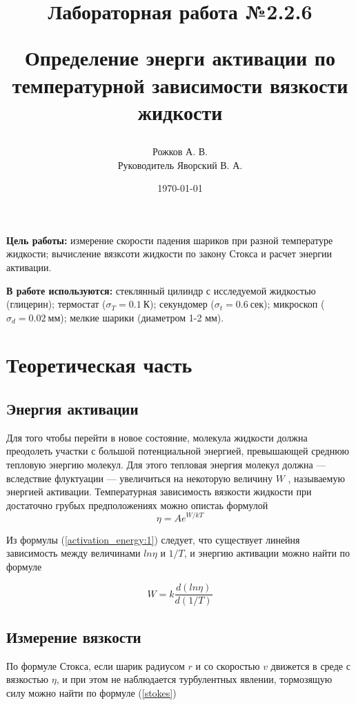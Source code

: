 \documentclass[a4paper, 12pt]{article}
\title{\begin{center}Лабораторная работа №2.2.6\end{center}
Определение энерги активации по температурной зависимости вязкости жидкости}
\author{Рожков А. В. \\ Руководитель Яворский В. А.}
\date{\today}
\begin{document}
    \maketitle
    \newpage


    \textbf{Цель работы:} измерение скорости падения шариков при разной температуре жидкости; вычисление вязксоти жидкости по закону Стокса и расчет энергии активации.

    \textbf{В работе используются:} стеклянный цилиндр с исследуемой жидкостью (глицерин); термостат ($\sigma_T = 0.1~К$); секундомер ($\sigma_t = 0.6~сек$); микроскоп ($\sigma_d = 0.02~мм$); мелкие шарики (диаметром 1-2 мм).

    \section{Теоретическая часть}
    \subsection{Энергия активации}
    Для того чтобы перейти в новое состояние, молекула жидкости должна преодолеть участки с большой потенциальной энергией, превышающей среднюю тепловую энергию молекул. Для этого тепловая энергия молекул должна — вследствие флуктуации — увеличиться на некоторую величину $W$ , называемую энергией активации. Температурная зависимость вязкости жидкости при достаточно грубых предположениях можно опистаь формулой
    \begin{equation} \label{activation_energy:1}
        \eta = A e^{W/kT}
    \end{equation}

    Из формулы (\ref{activation_energy:1}) следует, что существует линейня зависимость между величинами $ln\eta$ и $1/T$, и энергию активации можно найти по формуле

    \begin{equation} \label{activation_energy:2}
        W = k \frac{d(ln\eta)}{d(1/T)}
    \end{equation}

    \subsection{Измерение вязкости}
    По формуле Стокса, если шарик радиусом $r$ и со скоростью $v$ движется в среде с вязкостью $\eta$, и при этом не наблюдается турбулентных явлении, тормозящую силу можно найти по формуле (\ref{stokes})
\end{document}
